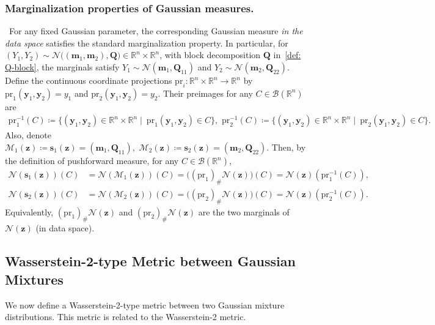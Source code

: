 \documentclass[opre,sglanonrev]{informs4}
\newcommand{\mN}{\mathcal{N}}
\newcommand{\mM}{\mathcal{M}}
\newcommand{\mB}{\mathcal{B}}
\newcommand{\mbR}{\mathbb R}
\newcommand{\bmean}{\bm{m}}
\newcommand{\bs}{\bm{s}}
\newcommand{\by}{\bm{y}}
\newcommand{\bz}{\bm{z}}
\newcommand{\bQ}{\bm Q}
\begin{document}
\subsubsection{Marginalization properties of Gaussian measures. }\, For any fixed Gaussian parameter, the corresponding Gaussian measure \emph{in the data space} satisfies the standard marginalization property. In particular,
for $(Y_1,Y_2)\sim \mN\!\bigl((\bmean_1,\bmean_2),\bQ\bigr) \in \mbR^n\times \mbR^n$, with block decomposition $\bQ$ in~\eqref{def: Q-block}, the marginals satisfy $Y_1\sim \mN(\bmean_1,\bQ_{11})$ and $Y_2\sim \mN(\bmean_2,\bQ_{22})$.
Define the continuous coordinate projections $\mathrm{pr}_i:\mbR^n\times\mbR^n\to \mbR^n$ by
$\mathrm{pr}_1(\by_1,\by_2)=y_1$ and $\mathrm{pr}_2(\by_1,\by_2)=y_2$. 
Their preimages for any $C\in\mB(\mbR^n)$ are
\begin{align}\label{eq: proj-preimage}
\mathrm{pr}^{-1}_1(C) \coloneqq \{(\by_1,\by_2)\in\mbR^n\times\mbR^n \mid\ \mathrm{pr}_1(\by_1,\by_2)\in C\}, \,\,
\mathrm{pr}^{-1}_2(C) \coloneqq \{(\by_1,\by_2)\in\mbR^n\times\mbR^n \mid\ \mathrm{pr}_2(\by_1,\by_2)\in C\}.   
\end{align}
Also, denote $\mM_1(\bz)\coloneqq \bs_1(\bz)=(\bmean_1,\bQ_{11}), \,\, 
\mM_2(\bz)\coloneqq \bs_2(\bz)=(\bmean_2,\bQ_{22})$. Then, by the definition of pushforward measure, for any $C\in\mB(\mbR^n)$,
\begin{equation}\label{def: proj-param}
\begin{aligned}
\mN(\bs_1(\bz))(C)
&=\mN(\mM_1(\bz))(C)
=\bigl((\mathrm{pr}_1)_{\#}\mN(\bz)\bigr)(C)
=\mN(\bz)\!\left(\mathrm{pr}^{-1}_1(C)\right),\\
\mN(\bs_2(\bz))(C)
&=\mN(\mM_2(\bz))(C)
=\bigl((\mathrm{pr}_2)_{\#}\mN(\bz)\bigr)(C)
=\mN(\bz)\!\left(\mathrm{pr}^{-1}_2(C)\right).
\end{aligned}
\end{equation}
Equivalently, $(\mathrm{pr}_1)_{\#}\mN(\bz)$ and $(\mathrm{pr}_2)_{\#}\mN(\bz)$ are the two marginals of $\mN(\bz)$ (in data space).



\subsection{Wasserstein-2-type Metric between Gaussian Mixtures}
We now define a Wasserstein-2-type metric between two Gaussian mixture distributions. This metric is related to the Wasserstein-2 metric. 
\end{document}
